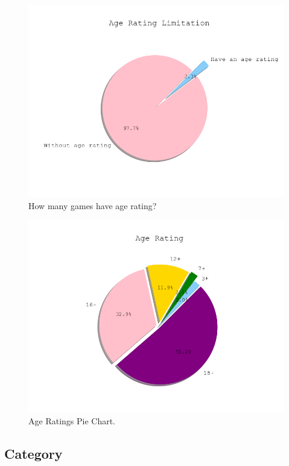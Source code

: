 \documentclass[conference]{IEEEtran}
\begin{document}
\begin{figure}[h]
  \includegraphics[width=\linewidth]{assets/age_rating_pie.png}
  \caption{How many games have age rating?}
  \label{fig:agerating1}
\end{figure}


\begin{figure}[h]
  \includegraphics[width=\linewidth]{assets/age_rating_has_pie.png}
  \caption{Age Ratings Pie Chart.}
  \label{fig:agerating2}
\end{figure}


\subsection{Category}
\end{document}
